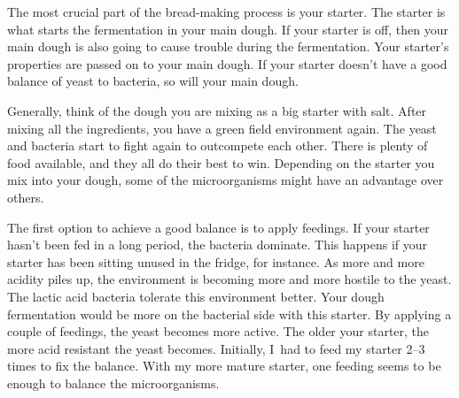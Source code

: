 The most crucial part of the bread-making process is your starter.
The starter is what starts the fermentation in your main dough.
If your starter is off, then your main dough is also going
to cause trouble during the fermentation. Your starter's
properties are passed on to your main dough. If your starter
doesn't have a good balance of yeast to bacteria, so will your
main dough.

\begin{flowchart}[!htb]
\begin{center}
  
  \caption[Process to prepare your starter before baking]{The process to check
      your sourdough starter when making wheat-based doughs. In practice
      I~frequently use a stiff sourdough starter. The stiff starter features
      enhanced yeast activity. In that case, you can use the same ratios as
      shown in the chart except for the water quantity. The stiff starter has
      a hydration of \qtyrange{50}{60}{\percent}. So you would have half the
      shown water quantities, i.e., if the chart shows \qty{100}{\gram} of
      water, use \qtyrange{50}{60}{\gram} of water for your stiff starter.}%
  \label{fig:process-starter-wheat-sourdough}
\end{center}
\end{flowchart}

Generally, think of the dough you are mixing as a big starter with salt.
After mixing all the ingredients, you have a green field environment again.
The yeast and bacteria start to fight again to outcompete each other.
There is plenty of food available, and they all do their best to win.
Depending on the starter you mix into your dough, some of the microorganisms
might have an advantage over others.

The first option to achieve a good balance is to apply feedings.
If your starter hasn't been fed in a long period, the
bacteria dominate. This happens if your starter has been
sitting unused in the fridge, for instance. As more and more
acidity piles up, the environment is becoming more and more hostile
to the yeast. The lactic acid bacteria tolerate this environment
better. Your dough fermentation would be more on the
bacterial side with this starter. By applying a couple of
feedings, the yeast becomes more active. The older your
starter, the more acid resistant the yeast becomes. Initially,
I~had to feed my starter 2--3 times to fix the balance. With my
more mature starter, one feeding seems to be enough to balance
the microorganisms.

